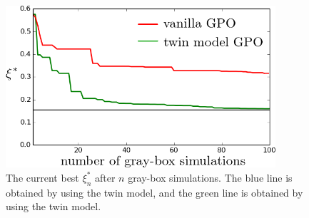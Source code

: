\documentclass[a4paper,onecolumn]{article}
\theoremstyle{remark}
\begin{document}
\begin{figure}[H]\begin{center}
    \includegraphics[width=10cm]{opt_BL.png}
    \caption{The current best $\xi^*_n$ after $n$ gray-box simulations.
    The blue line is obtained by using the twin model, and the green line is obtained by using
    the twin model.} 
    \label{fig:opt_BL}
\end{center}
\end{figure}
\end{document}

